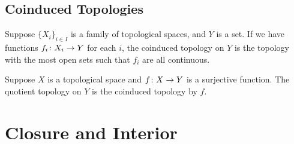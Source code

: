 \subsection*{Coinduced Topologies}

\begin{definition}
    Suppose \({\{X_i\}}_{i \in I}\) is a family of topological spaces, and \(Y\) is a set.
    If we have functions \(f_i\colon X_i\to Y\) for each \(i\),
    the coinduced topology on \(Y\) is the topology with the most open sets
    such that \(f_i\) are all continuous.
\end{definition}
\begin{definition}
    Suppose \(X\) is a topological space and \(f\colon X\to Y\) is a surjective function.
    The quotient topology on \(Y\) is the coinduced topology by \(f\).
\end{definition}


\section{Closure and Interior}

